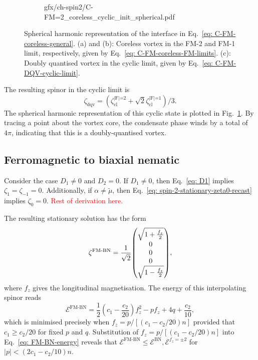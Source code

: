 \begin{figure}
\begin{subfigure}{0.49\textwidth}
        {gfx/ch-spin2/C-FM=2_coreless_cyclic_init_spherical.pdf}
        \caption{\label{subfig: C-FM-cyclic-DQV}}
    \end{subfigure}
    \caption[Spherical harmonic representation of a coreless vortex connection
        across a cyclic to ferromagnetic interface]
    {\label{fig: C-FM-coreless-initial-states}Spherical harmonic
        representation of the interface in Eq.~\eqref{eq: C-FM-coreless-general}.
        (a) and (b): Coreless vortex in the FM-2 and FM-1 limit, respectively,
        given by Eq.~\eqref{eq: C-FM-coreless-FM-limits}.
        (c): Doubly quantised vortex in the cyclic limit, given by
        Eq.~\eqref{eq: C-FM-DQV-cyclic-limit}.}
\end{figure}
The resulting spinor in the cyclic limit is
\begin{equation}\label{eq: C-FM-DQV-cyclic-limit}
    \zeta_\text{dqv}
    = \left(\zeta^\text{|F|=2}_\text{cl}
    + \sqrt{2}\zeta^\text{|F|=1}_\text{cl}\right) / 3.
\end{equation}
The spherical harmonic representation of this cyclic state is plotted in
Fig.~\ref{subfig: C-FM-cyclic-DQV}.
By tracing a point about the vortex core, the condensate phase winds by a total
of \(4\pi \), indicating that this is a doubly-quantised vortex.

\subsection{Ferromagnetic to biaxial nematic}
Consider the case \(D_1 \neq 0\) and \(D_2 = 0\).
If \(D_1 \neq 0\), then Eq.~\eqref{eq: D1} implies \(\zeta_1=\zeta_{-1} = 0\).
Additionally, if \(\alpha \neq \tilde{\mu}\),
then Eq.~\eqref{eq: spin-2-stationary-zeta0-recast} implies \(\zeta_0 = 0\).
\textcolor{red}{Rest of derivation here.}

The resulting stationary solution has the form
\begin{equation}\label{eq: FM-BN-interpolating-spinor}
    \zeta^\text{FM-BN} = \frac{1}{\sqrt{2}}\mqty(
    \sqrt{1 + \frac{f_z}{2}} \\ 0 \\ 0 \\ 0 \\
    \sqrt{1 - \frac{f_z}{2}}),
\end{equation}
where \(f_z\) gives the longitudinal magnetisation.
The energy of this interpolating spinor reads
\begin{equation}\label{eq: FM-BN-energy}
    \mathcal{E}^\text{FM-BN} = \frac{1}{2}\left(c_1-\frac{c_2}{20}\right)f_z^2
    - p f_z + 4q + \frac{c_2}{10},
\end{equation}
which is minimised precisely when \(f_z = p / [(c_1-c_2/20)n]\) provided that
\(c_1 \geq c_2/20\) for fixed \(p\) and \(q\).
Substitution of \(f_z = p / [(c_1-c_2/20)n]\) into Eq.~\eqref{eq: FM-BN-energy}
reveals that \(\mathcal{E}^\text{FM-BN} \leq \mathcal{E}^\text{BN},
\mathcal{E}^{f_z=\pm 2}\) for \(|p| < (2c_1-c_2/10)n\).

